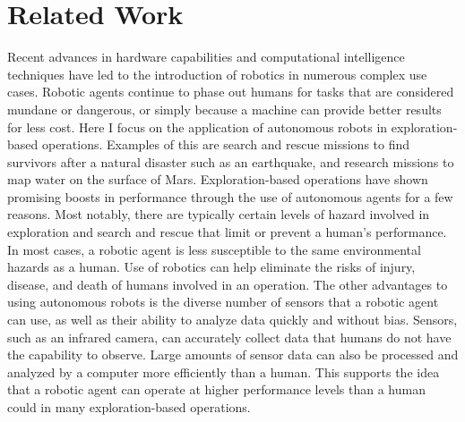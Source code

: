 

\chapter{Related Work} \label{ch:related_works}
Recent advances in hardware capabilities and computational intelligence techniques have led to the introduction of robotics in numerous complex use cases.
Robotic agents continue to phase out humans for tasks that are considered mundane or dangerous, or simply because a machine can provide better results for less cost.
Here I focus on the application of autonomous robots in exploration-based operations.
Examples of this are search and rescue missions to find survivors after a natural disaster such as an earthquake, and research missions to map water on the surface of Mars.
Exploration-based operations have shown promising boosts in performance through the use of autonomous agents for a few reasons.
Most notably, there are typically certain levels of hazard involved in exploration and search and rescue that limit or prevent a human's performance.
In most cases, a robotic agent is less susceptible to the same environmental hazards as a human.
Use of robotics can help eliminate the risks of injury, disease, and death of humans involved in an operation.
The other advantages to using autonomous robots is the diverse number of sensors that a robotic agent can use, as well as their ability to analyze data quickly and without bias.
Sensors, such as an infrared camera, can accurately collect data that humans do not have the capability to observe.
Large amounts of sensor data can also be processed and analyzed by a computer more efficiently than a human.
This supports the idea that a robotic agent can operate at higher performance levels than a human could in many exploration-based operations.


